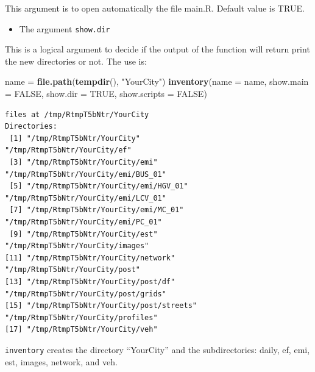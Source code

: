 \documentclass[12pt,graybox,envcountchap,sectrefs]{krantz}
\makeatletter
\newenvironment{Shaded}{\begin{snugshade}}{\end{snugshade}}
\newcommand{\KeywordTok}[1]{\textcolor[rgb]{0.13,0.29,0.53}{\textbf{#1}}}
\newcommand{\DataTypeTok}[1]{\textcolor[rgb]{0.13,0.29,0.53}{#1}}
\newcommand{\StringTok}[1]{\textcolor[rgb]{0.31,0.60,0.02}{#1}}
\newcommand{\OtherTok}[1]{\textcolor[rgb]{0.56,0.35,0.01}{#1}}
\newcommand{\NormalTok}[1]{#1}
\providecommand{\tightlist}{%
  \setlength{\itemsep}{0pt}\setlength{\parskip}{0pt}}
\newenvironment{kframe}{%
\medskip{}
\setlength{\fboxsep}{.8em}
 \def\at@end@of@kframe{}%
 \ifinner\ifhmode%
  \def\at@end@of@kframe{\end{minipage}}%
  \begin{minipage}{\columnwidth}%
 \fi\fi%
 \def\FrameCommand##1{\hskip\@totalleftmargin \hskip-\fboxsep
 \colorbox{shadecolor}{##1}\hskip-\fboxsep
     \hskip-\linewidth \hskip-\@totalleftmargin \hskip\columnwidth}%
 \MakeFramed {\advance\hsize-\width
   \@totalleftmargin\z@ \linewidth\hsize
   \@setminipage}}%
 {\par\unskip\endMakeFramed%
 \at@end@of@kframe}
\renewenvironment{Shaded}{\begin{kframe}}{\end{kframe}}
\theoremstyle{definition}
\theoremstyle{definition}
\theoremstyle{definition}
\theoremstyle{remark}
\makeatother
\begin{document}
This argument is to open automatically the file main.R. Default value is
TRUE.

\begin{itemize}
\tightlist
\item
  The argument \texttt{show.dir}
\end{itemize}

This is a logical argument to decide if the output of the function will
return print the new directories or not. The use is:

\begin{Shaded}
\begin{Highlighting}[]
\NormalTok{name =}\StringTok{ }\KeywordTok{file.path}\NormalTok{(}\KeywordTok{tempdir}\NormalTok{(), }\StringTok{"YourCity"}\NormalTok{)}
\KeywordTok{inventory}\NormalTok{(}\DataTypeTok{name =}\NormalTok{ name, }\DataTypeTok{show.main =} \OtherTok{FALSE}\NormalTok{, }\DataTypeTok{show.dir =} \OtherTok{TRUE}\NormalTok{, }\DataTypeTok{show.scripts =} \OtherTok{FALSE}\NormalTok{)}
\end{Highlighting}
\end{Shaded}

\begin{verbatim}
files at /tmp/RtmpT5bNtr/YourCity
Directories:
 [1] "/tmp/RtmpT5bNtr/YourCity"              "/tmp/RtmpT5bNtr/YourCity/ef"          
 [3] "/tmp/RtmpT5bNtr/YourCity/emi"          "/tmp/RtmpT5bNtr/YourCity/emi/BUS_01"  
 [5] "/tmp/RtmpT5bNtr/YourCity/emi/HGV_01"   "/tmp/RtmpT5bNtr/YourCity/emi/LCV_01"  
 [7] "/tmp/RtmpT5bNtr/YourCity/emi/MC_01"    "/tmp/RtmpT5bNtr/YourCity/emi/PC_01"   
 [9] "/tmp/RtmpT5bNtr/YourCity/est"          "/tmp/RtmpT5bNtr/YourCity/images"      
[11] "/tmp/RtmpT5bNtr/YourCity/network"      "/tmp/RtmpT5bNtr/YourCity/post"        
[13] "/tmp/RtmpT5bNtr/YourCity/post/df"      "/tmp/RtmpT5bNtr/YourCity/post/grids"  
[15] "/tmp/RtmpT5bNtr/YourCity/post/streets" "/tmp/RtmpT5bNtr/YourCity/profiles"    
[17] "/tmp/RtmpT5bNtr/YourCity/veh"     
\end{verbatim}

\texttt{inventory} creates the directory ``YourCity'' and the
subdirectories: daily, ef, emi, est, images, network, and veh.
\end{document}
